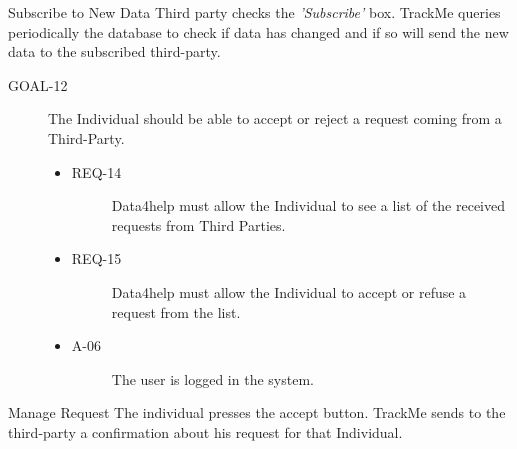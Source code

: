 \documentclass[a4paper]{article}
\newcommand{\requirement}{\ding{229}}%
\begin{document}
        \begin{usecase}{Subscribe to New Data}
            {Third party checks the \textit{'Subscribe'} box.}
            {TrackMe queries periodically the database to check if data has changed and if so will send the new data to the subscribed third-party.}
        \end{usecase}
        
        \begin{description}
        	\item[GOAL-12] The Individual should be able to accept or reject a request coming from a Third-Party. 
            	\begin{itemize}
            	    \item[\requirement]
                	\begin{description}
                	\item[REQ-14] Data4help must allow the Individual to see a list of the received requests from Third Parties. 
                	\end{description}
                	\item[\requirement]
                	\begin{description}
                	\item[REQ-15] Data4help must allow the Individual to accept or refuse a request from the list. 
                	\end{description}
                	\item
                	\begin{description}
                	\item[A-06] The user is logged in the system.
                	\end{description}
                	\end{itemize}
        \end{description}
        
        \begin{usecase}{Manage Request}
              {The individual presses the accept button.}
              {TrackMe sends to the third-party a confirmation about his request for that Individual.}
        \end{usecase}
        
\end{document}
